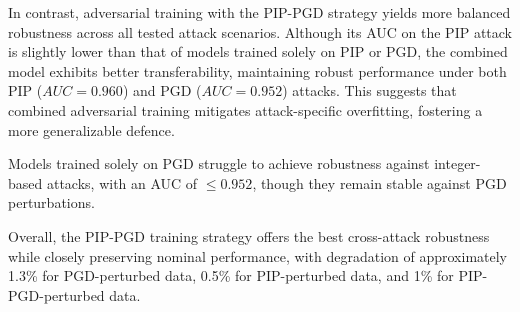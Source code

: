 In contrast, adversarial training with the PIP-PGD strategy yields more balanced robustness across all tested attack scenarios. Although its AUC on the PIP attack is slightly lower than that of models trained solely on PIP or PGD, the combined model exhibits better transferability, maintaining robust performance under both PIP ($AUC = 0.960$) and PGD ($AUC = 0.952$) attacks. This suggests that combined adversarial training mitigates attack-specific overfitting, fostering a more generalizable defence.

Models trained solely on PGD struggle to achieve robustness against integer-based attacks, with an AUC of  $\le0.952$, though they remain stable against PGD perturbations.

Overall, the PIP-PGD training strategy offers the best cross-attack robustness while closely preserving nominal performance, with degradation of approximately 1.3\% for PGD-perturbed data, 0.5\% for PIP-perturbed data, and 1\% for PIP-PGD-perturbed data.